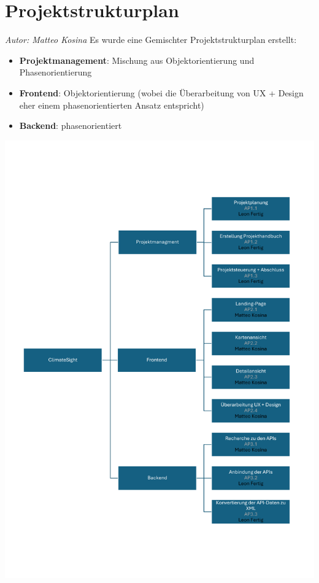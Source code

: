 \documentclass[12pt]{article}
\begin{document}
\section{Projektstrukturplan}
{\it Autor: Matteo Kosina}
\newline
Es wurde eine Gemischter Projektstrukturplan erstellt:
\begin{itemize}
	\item {\bf Projektmanagement}: Mischung aus Objektorientierung und Phasenorientierung
	\item {\bf Frontend}: Objektorientierung (wobei die Überarbeitung von UX + Design eher einem phasenorientierten Ansatz entspricht)
	\item {\bf Backend}: phasenorientiert
\end{itemize}
\includegraphics[width=\textwidth]{Planungsdokumente/graphics/Projektstrukturplan.pdf}
\end{document}
